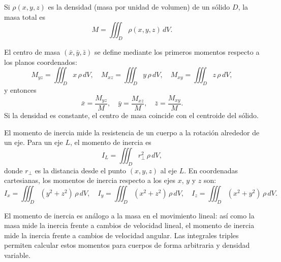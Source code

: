 \begin{definition}

Si \(\rho(x,y,z)\) es la densidad (masa por unidad de volumen) de un sólido \(D\), la masa total es
\[
M = \iiint_D \rho(x,y,z)\,dV.
\]
\end{definition}

\begin{definition}
El centro de masa \((\bar{x},\bar{y},\bar{z})\) se define mediante los primeros momentos respecto a los planos coordenados:
\[
M_{yz} = \iiint_D x\,\rho\,dV,\quad
M_{xz} = \iiint_D y\,\rho\,dV,\quad
M_{xy} = \iiint_D z\,\rho\,dV,
\]
y entonces
\[
\bar{x} = \frac{M_{yz}}{M},\quad
\bar{y} = \frac{M_{xz}}{M},\quad
\bar{z} = \frac{M_{xy}}{M}.
\]
Si la densidad es constante, el centro de masa coincide con el centroide del sólido.
\end{definition}
\begin{definition}

El momento de inercia mide la resistencia de un cuerpo a la rotación alrededor de un eje. Para un eje \(L\), el momento de inercia es
\[
I_L = \iiint_D r_{\perp}^2\,\rho\,dV,
\]
donde \(r_{\perp}\) es la distancia desde el punto \((x,y,z)\) al eje \(L\). En coordenadas cartesianas, los momentos de inercia respecto a los ejes \(x\), \(y\) y \(z\) son:
\[
I_x = \iiint_D (y^2+z^2)\,\rho\,dV,\quad
I_y = \iiint_D (x^2+z^2)\,\rho\,dV,\quad
I_z = \iiint_D (x^2+y^2)\,\rho\,dV.
\]
\end{definition}
\begin{rem}
El momento de inercia es análogo a la masa en el movimiento lineal: así como la masa mide la inercia frente a cambios de velocidad lineal, el momento de inercia mide la inercia frente a cambios de velocidad angular. Las integrales triples permiten calcular estos momentos para cuerpos de forma arbitraria y densidad variable.
\end{rem}

